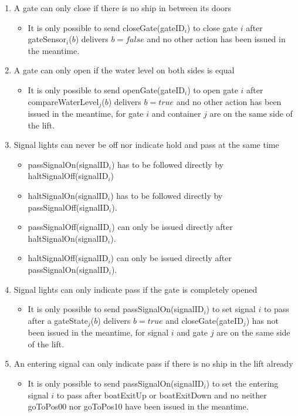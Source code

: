 \begin{enumerate}
	\item A gate can only close if there is no ship in between its doors
	\begin{itemize}
		\item It is only possible to send closeGate(gateID$_i$) to close gate $i$ after gateSensor$_i$($b$) delivers $b = false$ and no other action has been issued in the meantime.
	\end{itemize}
	
	\item A gate can only open if the water level on both sides is equal
	\begin{itemize}
		\item It is only possible to send openGate(gateID$_i$) to open gate $i$ after \linebreak compareWaterLevel$_j$($b$) delivers $b = true$ and no other action has been issued in the meantime, for gate $i$ and container $j$ are on the same side of the lift.
	\end{itemize}
	
	\item Signal lights can never be off nor indicate hold and pass at the same time
		\begin{itemize}
			\item passSignalOn(signalID$_i$) has to be followed directly by haltSignalOff(signalID$_i$)
			\item haltSignalOn(signalID$_i$) has to be followed directly by passSignalOff(signalID$_i$).
			\item passSignalOff(signalID$_i$) can only be issued directly after haltSignalOn(signalID$_i$).
			\item haltSignalOff(signalID$_i$) can only be issued directly after passSignalOn(signalID$_i$).
		\end{itemize}
	\item Signal lights can only indicate pass if the gate is completely opened
		\begin{itemize}
			\item It is only possible to send passSignalOn(signalID$_i$) to set signal $i$ to pass after a gateState$_j$($ b $) delivers $b = true$ and closeGate(gateID$_j$) has not been issued in the meantime, for signal $i$ and gate $j$ are on the same side of the lift.
		\end{itemize}
	\item An entering signal can only indicate pass if there is no ship in the lift already
		\begin{itemize}
			\item It is only possible to send passSignalOn(signalID$_i$) to set the entering signal $i$ to pass after boatExitUp or boatExitDown and no neither goToPos00 nor goToPos10 have been issued in the meantime.\vspace{0.3cm}
		\end{itemize}
\end{enumerate}